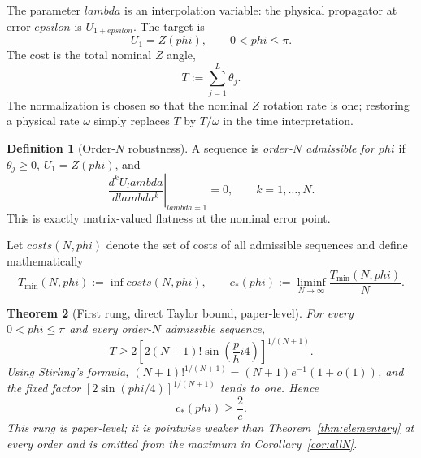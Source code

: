\documentclass[%
  aps,
  pra,
  preprint,
  superscriptaddress,
  amsmath,amssymb,
  nofootinbib,
  floatfix,
]{revtex4-2}
\def\lambda{lambda}\def\tau{tau}\def\phi{phi}\def\alpha{alpha}%
\def\eps{epsilon}\def\C{C}\def\R{R}\def\lean#1{#1}\def\mathrm#1{#1}%
\newtheorem{theorem}{Theorem}
\theoremstyle{definition}
\newtheorem{definition}[theorem]{Definition}
\theoremstyle{remark}
\newcommand{\C}{\mathbb C}
\newcommand{\R}{\mathbb R}
\newcommand{\eps}{\varepsilon}
\newcommand{\cstar}{c_*}
\DeclareRobustCommand{\lean}[1]{\path{#1}}
\begin{document}
The parameter $\lambda$ is an interpolation variable: the physical propagator at error $\eps$ is
$U_{1+\eps}$. The target is
\begin{equation}
U_1=Z(\phi),\qquad 0<\phi\le\pi.
\label{eq:target}
\end{equation}
The cost is the total nominal $Z$ angle,
\begin{equation}
T:=\sum_{j=1}^L\theta_j.
\label{eq:cost}
\end{equation}
The normalization is chosen so that the nominal $Z$ rotation rate is one; restoring a physical
rate $\omega$ simply replaces $T$ by $T/\omega$ in the time interpretation.

\begin{definition}[Order-$N$ robustness]
\label{def:admissible}
A sequence is \emph{order-$N$ admissible for $\phi$} if
$\theta_j\ge0$, $U_1=Z(\phi)$, and
\begin{equation}
\left.\frac{\mathrm{d}^k U_\lambda}{\mathrm{d}\lambda^k}\right|_{\lambda=1}=0,
\qquad k=1,\ldots,N.
\label{eq:robustness}
\end{equation}
This is exactly matrix-valued flatness at the nominal error point.
\end{definition}

Let $\mathrm{costs}(N,\phi)$ denote the set of costs of all admissible sequences and define
mathematically
\begin{equation}
T_{\min}(N,\phi):=\inf\mathrm{costs}(N,\phi),
\qquad
\cstar(\phi):=\liminf_{N\to\infty}\frac{T_{\min}(N,\phi)}{N}.
\label{eq:tmin}
\end{equation}

\begin{theorem}[First rung, direct Taylor bound, paper-level]
\label{thm:direct}
For every $0<\phi\le\pi$ and every order-$N$ admissible sequence,
\begin{equation}
\displaystyle
T\ge
2\left[2(N+1)!\sin\left(\frac\phi4\right)\right]^{1/(N+1)}.
\label{eq:2e-finite}
\end{equation}
Using Stirling's formula,
$(N+1)!^{1/(N+1)}=(N+1)\mathrm{e}^{-1}(1+o(1))$, and the fixed factor
$[2\sin(\phi/4)]^{1/(N+1)}$ tends to one. Hence
\begin{equation}
\cstar(\phi)\ge\frac{2}{\mathrm{e}}.
\label{eq:2e}
\end{equation}
This rung is paper-level; it is pointwise weaker than Theorem~\ref{thm:elementary} at every
order and is omitted from the maximum in Corollary~\ref{cor:allN}.
\end{theorem}
\end{document}
